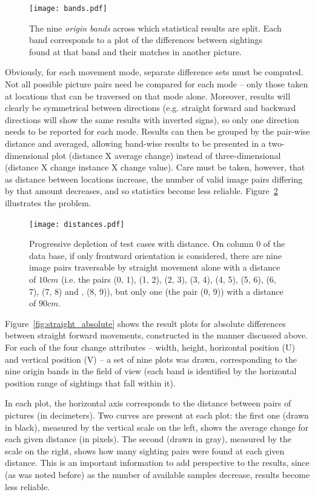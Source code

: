 \documentclass[twocolumn, 9pt]{jsproceedings}
\begin{document}
\begin{figure}[h!]
\texttt{[image: bands.pdf]}
\caption{The nine {\it origin bands} across which statistical results are split. Each band corresponds to a plot of the differences between sightings found at that band and their matches in another picture.}
\label{fig:bands}
\end{figure}

Obviously, for each movement mode, separate difference sets must be computed. Not all possible picture pairs need be compared for each mode -- only those taken at locations that can be traversed on that mode alone. Moreover, results will clearly be symmetrical between directions (e.g. straight forward and backward directions will show the same results with inverted signs), so only one direction needs to be reported for each mode. Results can then be grouped by the pair-wise distance and averaged, allowing band-wise results to be presented in a two-dimensional plot (distance X average change) instead of three-dimensional (distance X change instance X change value). Care must be taken, however, that as distance between locations increase, the number of valid image pairs differing by that amount decreases, and so statistics become less reliable. Figure~\ref{fig:distances} illustrates the problem.

\begin{figure}[h!]
\texttt{[image: distances.pdf]}
\caption{Progressive depletion of test cases with distance. On column \(0\) of the data base, if only frontward orientation is considered, there are nine image pairs traversable by straight movement alone with a distance of \(10cm\) (i.e. the pairs (0, 1), (1, 2), (2, 3), (3, 4), (4, 5), (5, 6), (6, 7), (7, 8) and , (8, 9)), but only one (the pair (0, 9)) with a distance of \(90cm\).}
\label{fig:distances}
\end{figure}

Figure~\ref{fig:straight_absolute} shows the result plots for absolute differences between straight forward movements, constructed in the manner discussed above. For each of the four change attributes -- width, height, horizontal position (U) and vertical position (V) -- a set of nine plots was drawn, corresponding to the nine origin bands in the field of view (each band is identified by the horizontal position range of sightings that fall within it).

In each plot, the horizontal axis corresponds to the distance between pairs of pictures (in decimeters). Two curves are present at each plot: the first one (drawn in black), measured by the vertical scale on the left, shows the average change for each given distance (in pixels). The second (drawn in gray), measured by the scale on the right, shows how many sighting pairs were found at each given distance. This is an important information to add perspective to the results, since (as was noted before) as the number of available samples decrease, results become less reliable.
\end{document}
